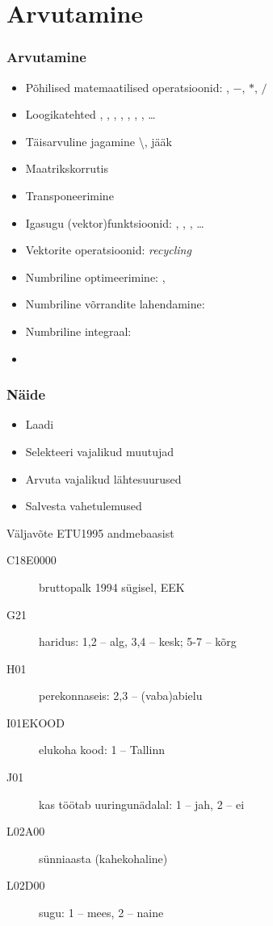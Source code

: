 \documentclass[pdftex]{beamer}
\begin{document}
\section{Arvutamine}

\begin{frame}
  \frametitle{Arvutamine}
  \begin{itemize}
  \item Põhilised matemaatilised operatsioonid: \code{+}, $-$, $*$, $/$
  \item Loogikatehted \code{!}, \code{\&}, \code{|}, \code{==},
    \code{<}, \code{<=}, , \dots
  \item Täisarvuline jagamine \textbackslash{}, jääk \code{\%\%}
  \item Maatrikskorrutis \code{\%*\%}
  \item Transponeerimine 
    \pause
  \item Igasugu (vektor)funktsioonid: , ,
    , \dots
  \item Vektorite operatsioonid: \emph{recycling}
    \pause
  \item Numbriline optimeerimine: , 
  \item Numbriline võrrandite lahendamine: 
  \item Numbriline integraal: 
  \item {}
  \end{itemize}
\end{frame}

\begin{frame}
  \frametitle{Näide}
  \begin{itemize}
  \item Laadi 
  \item Selekteeri vajalikud muutujad
  \item Arvuta vajalikud lähtesuurused
  \item Salvesta vahetulemused
  \end{itemize}
  \pause
  Väljavõte ETU1995 andmebaasist
  \begin{description}
  \item[C18E0000] bruttopalk 1994 sügisel, EEK
  \item[G21] haridus: 1,2 -- alg, 3,4 -- kesk; 5-7 -- kõrg
  \item[H01] perekonnaseis: 2,3 -- (vaba)abielu
  \item[I01EKOOD] elukoha kood: 1 -- Tallinn
  \item[J01] kas töötab uuringunädalal: 1 -- jah, 2 -- ei
  \item[L02A00] sünniaasta (kahekohaline)
  \item[L02D00] sugu: 1 -- mees, 2 -- naine
  \end{description}
\end{frame}
\end{document}
